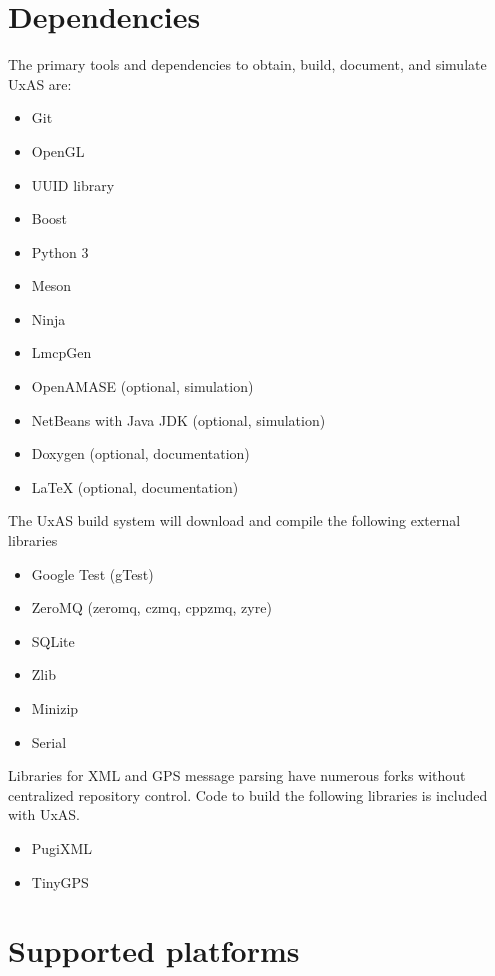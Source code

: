 \section{Dependencies}\label{dependencies}

The primary tools and dependencies to obtain, build, document, and
simulate UxAS are:

\begin{itemize}
\item
  Git
\item
  OpenGL
\item
  UUID library
\item
  Boost
\item
  Python 3
\item
  Meson
\item
  Ninja
\item
  LmcpGen
\item
  OpenAMASE (optional, simulation)
\item
  NetBeans with Java JDK (optional, simulation)
\item
  Doxygen (optional, documentation)
\item
  LaTeX (optional, documentation)
\end{itemize}

The UxAS build system will download and compile the following external
libraries

\begin{itemize}
\item
  Google Test (gTest)
\item
  ZeroMQ (zeromq, czmq, cppzmq, zyre)
\item
  SQLite
\item
  Zlib
\item
  Minizip
\item
  Serial
\end{itemize}

Libraries for XML and GPS message parsing have numerous forks without
centralized repository control. Code to build the following libraries is
included with UxAS.

\begin{itemize}
\item
  PugiXML
\item
  TinyGPS
\end{itemize}

\section{Supported platforms}\label{supported-platforms}

